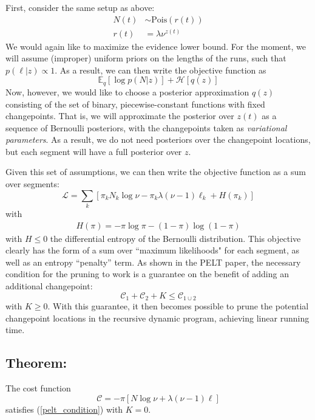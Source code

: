 \documentclass[11pt]{article}
\begin{document}
First, consider the same setup as above:
\begin{align}
    N(t) &\sim \mathrm{Pois}(r(t)) \\
    r(t) &= \lambda \nu^{z(t)}
\end{align}
We would again like to maximize the evidence lower bound. For the moment, we will assume (improper) uniform priors on the lengths of the runs, such that $p(\ell|z) \propto 1$. As a result, we can then write the objective function as 
\begin{equation}
    \mathbb{E}_q \left[\log p(N|z) \right] + \mathcal{H}[q(z)]
\end{equation}
Now, however, we would like to choose a posterior approximation $q(z)$ consisting of the set of binary, piecewise-constant functions with fixed changepoints. That is, we will approximate the posterior over $z(t)$ as a sequence of Bernoulli posteriors, with the changepoints taken as \emph{variational parameters}. As a result, we do not need posteriors over the changepoint locations, but each segment will have a full posterior over $z$.

Given this set of assumptions, we can then write the objective function as a sum over segments:
\begin{equation}
    \mathcal{L} = \sum_k \left[ 
    \pi_k N_k \log \nu - \pi_k \lambda (\nu - 1) \ell_k + H(\pi_k)
    \right]    
\end{equation}
with 
\begin{align}
    H(\pi) = -\pi \log \pi - (1 - \pi) \log (1 - \pi)
\end{align}
with $H \le 0$ the differential entropy of the Bernoulli distribution. This objective clearly has the form of a sum over ``maximum likelihoods" for each segment, as well as an entropy ``penalty'' term. As shown in the PELT paper, the necessary condition for the pruning to work is a guarantee on the benefit of adding an additional changepoint:
\begin{equation}
    \label{pelt_condition}
    \mathcal{C}_1 + \mathcal{C}_2 + K \le \mathcal{C}_{1 \cup 2}
\end{equation}
with $K \ge 0$. With this guarantee, it then becomes possible to prune the potential changepoint locations in the recursive dynamic program, achieving linear running time.

\subsection*{Theorem:} The cost function 
\begin{equation}
    \mathcal{C} = -\pi [N \log \nu + \lambda (\nu - 1)\ell]
\end{equation}
satisfies (\ref{pelt_condition}) with $K = 0$.
\end{document}
